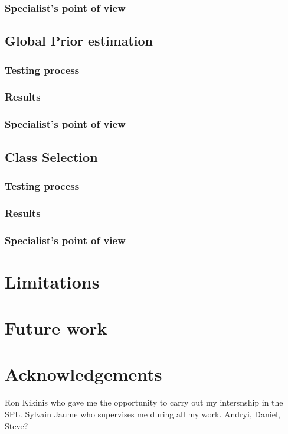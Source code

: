 \subsubsection{Specialist's point of view}
%
\subsection{Global Prior estimation}
%
\subsubsection{Testing process}
%
\subsubsection{Results}
%
\subsubsection{Specialist's point of view}
%
\subsection{Class Selection}
%
\subsubsection{Testing process}
%
\subsubsection{Results}
%
\subsubsection{Specialist's point of view}
%
\section{Limitations}

\section{Future work}
\newpage
\section*{Acknowledgements}
Ron Kikinis who gave me the opportunity to carry out my intersnship in the SPL.
Sylvain Jaume who supervises me during all my work.
Andryi, Daniel, Steve?

